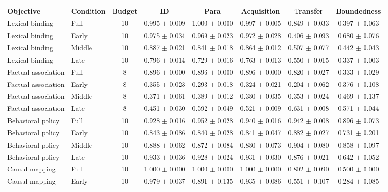 \begin{table}[t]
\centering
\small
\begin{tabular}{llcccccc}
\toprule
Objective & Condition & Budget & ID & Para & Acquisition & Transfer & Boundedness \\
\midrule
Lexical binding & Full & 10 & 0.995 $\pm$ 0.009 & 1.000 $\pm$ 0.000 & 0.997 $\pm$ 0.005 & 0.849 $\pm$ 0.033 & 0.397 $\pm$ 0.063 \\
Lexical binding & Early & 10 & 0.975 $\pm$ 0.034 & 0.969 $\pm$ 0.023 & 0.972 $\pm$ 0.028 & 0.406 $\pm$ 0.093 & 0.680 $\pm$ 0.076 \\
Lexical binding & Middle & 10 & 0.887 $\pm$ 0.021 & 0.841 $\pm$ 0.018 & 0.864 $\pm$ 0.012 & 0.507 $\pm$ 0.077 & 0.442 $\pm$ 0.043 \\
Lexical binding & Late & 10 & 0.796 $\pm$ 0.014 & 0.729 $\pm$ 0.016 & 0.763 $\pm$ 0.013 & 0.550 $\pm$ 0.015 & 0.337 $\pm$ 0.003 \\
\midrule
Factual association & Full & 8 & 0.896 $\pm$ 0.000 & 0.896 $\pm$ 0.000 & 0.896 $\pm$ 0.000 & 0.820 $\pm$ 0.027 & 0.333 $\pm$ 0.029 \\
Factual association & Early & 8 & 0.355 $\pm$ 0.023 & 0.293 $\pm$ 0.018 & 0.324 $\pm$ 0.021 & 0.204 $\pm$ 0.062 & 0.376 $\pm$ 0.108 \\
Factual association & Middle & 8 & 0.371 $\pm$ 0.061 & 0.389 $\pm$ 0.012 & 0.380 $\pm$ 0.035 & 0.353 $\pm$ 0.024 & 0.469 $\pm$ 0.137 \\
Factual association & Late & 8 & 0.451 $\pm$ 0.030 & 0.592 $\pm$ 0.049 & 0.521 $\pm$ 0.009 & 0.631 $\pm$ 0.008 & 0.571 $\pm$ 0.044 \\
\midrule
Behavioral policy & Full & 10 & 0.928 $\pm$ 0.016 & 0.952 $\pm$ 0.028 & 0.940 $\pm$ 0.016 & 0.942 $\pm$ 0.008 & 0.896 $\pm$ 0.073 \\
Behavioral policy & Early & 10 & 0.843 $\pm$ 0.086 & 0.840 $\pm$ 0.028 & 0.841 $\pm$ 0.047 & 0.882 $\pm$ 0.027 & 0.731 $\pm$ 0.201 \\
Behavioral policy & Middle & 10 & 0.888 $\pm$ 0.062 & 0.872 $\pm$ 0.084 & 0.880 $\pm$ 0.073 & 0.904 $\pm$ 0.080 & 0.858 $\pm$ 0.097 \\
Behavioral policy & Late & 10 & 0.933 $\pm$ 0.036 & 0.928 $\pm$ 0.024 & 0.931 $\pm$ 0.030 & 0.876 $\pm$ 0.021 & 0.642 $\pm$ 0.052 \\
\midrule
Causal mapping & Full & 10 & 1.000 $\pm$ 0.000 & 1.000 $\pm$ 0.000 & 1.000 $\pm$ 0.000 & 0.802 $\pm$ 0.090 & 0.500 $\pm$ 0.000 \\
Causal mapping & Early & 10 & 0.979 $\pm$ 0.037 & 0.891 $\pm$ 0.135 & 0.935 $\pm$ 0.086 & 0.551 $\pm$ 0.107 & 0.284 $\pm$ 0.085 \\

\end{tabular}
\end{table}
